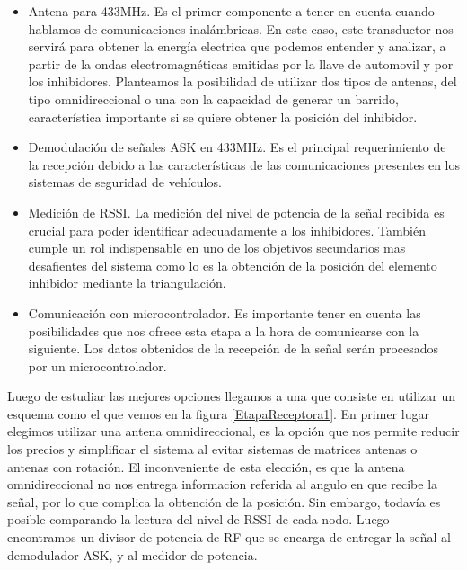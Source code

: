 \begin{itemize}
    \item Antena para 433MHz. Es el primer componente a tener en cuenta cuando hablamos de comunicaciones inalámbricas. En este caso, 
    este transductor nos servirá para obtener la energía electrica que podemos entender y analizar, a partir de la ondas electromagnéticas
    emitidas por la llave de automovil y por los inhibidores. Planteamos la posibilidad de utilizar dos tipos de antenas, del tipo 
    omnidireccional o una con la capacidad de generar un barrido, característica importante si se quiere obtener la posición del inhibidor.

    \item Demodulación de señales ASK en 433MHz. Es el principal requerimiento de la recepción debido a las características de las 
    comunicaciones presentes en los sistemas de seguridad de vehículos.

    \item Medición de RSSI. La medición del nivel de potencia de la señal recibida es crucial para poder identificar adecuadamente
    a los inhibidores. También cumple un rol indispensable en uno de los objetivos secundarios mas desafientes del sistema como lo es la obtención
    de la posición del elemento inhibidor mediante la triangulación.

    \item Comunicación con microcontrolador. Es importante tener en cuenta las posibilidades que nos ofrece esta etapa a la hora de comunicarse
    con la siguiente. Los datos obtenidos de la recepción de la señal serán procesados por un microcontrolador.

\end{itemize}

Luego de estudiar las mejores opciones llegamos a una que consiste en utilizar un esquema como el que vemos en la figura
\ref{EtapaReceptora1}. En primer lugar elegimos utilizar una antena omnidireccional, es la opción que nos permite reducir los precios
y simplificar el sistema al evitar sistemas de matrices antenas o antenas con rotación.
El inconveniente de esta elección, es que la antena omnidireccional no nos entrega informacion referida al angulo en que recibe la señal, por lo que
complica la obtención de la posición. Sin embargo, todavía es posible comparando la lectura del nivel de RSSI de cada nodo.
Luego encontramos un divisor de potencia de RF que se encarga de entregar la señal al demodulador ASK, y al medidor de potencia. \par

